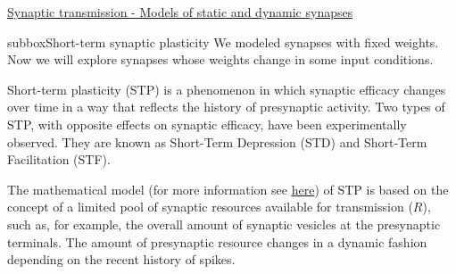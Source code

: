 \begin{textbox}{\href{https://compneuro.neuromatch.io/tutorials/W2D3_BiologicalNeuronModels/student/W2D3_Tutorial3.html}{Synaptic transmission - Models of static and dynamic synapses } }
\begin{subbox}{subbox}{Short-term synaptic plasticity}
\scriptsize
We modeled synapses with fixed weights. Now we will explore synapses whose weights change in some input conditions. 

Short-term plasticity (STP) is a phenomenon in which synaptic efficacy changes over time in a way that reflects the history of presynaptic activity. Two types of STP, with opposite effects on synaptic efficacy, have been experimentally observed. They are known as Short-Term Depression (STD) and Short-Term Facilitation (STF).

The mathematical model (for more information see \href{http://www.scholarpedia.org/article/Short-term_synaptic_plasticity}{here}) of STP is based on the concept of a limited pool of synaptic resources available for transmission ($R$), such as, for example, the overall amount of synaptic vesicles at the presynaptic terminals. The amount of presynaptic resource changes in a dynamic fashion depending on the recent history of spikes. 


\end{subbox}
\end{textbox}
